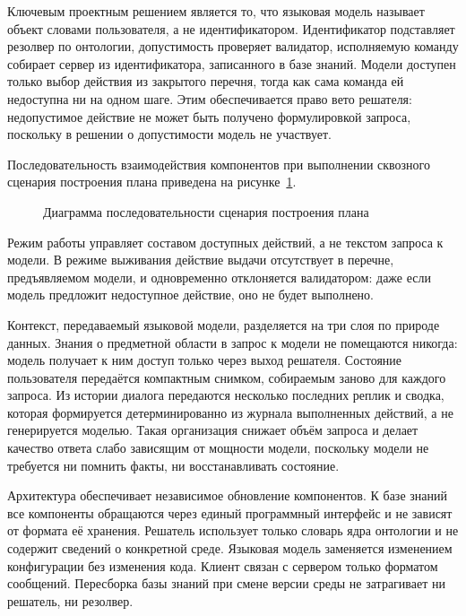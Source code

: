 Ключевым проектным решением является то, что языковая модель называет объект словами
пользователя, а не идентификатором. Идентификатор подставляет резолвер по онтологии,
допустимость проверяет валидатор, исполняемую команду собирает сервер из
идентификатора, записанного в базе знаний. Модели доступен только выбор действия из
закрытого перечня, тогда как сама команда ей недоступна ни на одном шаге. Этим
обеспечивается право вето решателя: недопустимое действие не может быть получено
формулировкой запроса, поскольку в решении о допустимости модель не участвует\cite{Schick2023,Yao2023}.

Последовательность взаимодействия компонентов при выполнении сквозного сценария
построения плана приведена на рисунке~\ref{fig:sequence}.

\begin{figure}[!htb]
  \centering
  
  \caption{Диаграмма последовательности сценария построения плана}
  \label{fig:sequence}
\end{figure}

Режим работы управляет составом доступных действий, а не текстом запроса к модели. В
режиме выживания действие выдачи отсутствует в перечне, предъявляемом модели, и
одновременно отклоняется валидатором: даже если модель предложит недоступное действие,
оно не будет выполнено.

Контекст, передаваемый языковой модели, разделяется на три слоя по природе данных.
Знания о предметной области в запрос к модели не помещаются никогда: модель получает к
ним доступ только через выход решателя. Состояние пользователя передаётся компактным
снимком, собираемым заново для каждого запроса. Из истории диалога передаются
несколько последних реплик и сводка, которая формируется детерминированно из журнала
выполненных действий, а не генерируется моделью. Такая организация снижает объём
запроса и делает качество ответа слабо зависящим от мощности модели, поскольку модели
не требуется ни помнить факты, ни восстанавливать состояние\cite{Lewis2020}.

Архитектура обеспечивает независимое обновление компонентов. К базе знаний все
компоненты обращаются через единый программный интерфейс и не зависят от формата её
хранения. Решатель использует только словарь ядра онтологии и не содержит сведений о
конкретной среде. Языковая модель заменяется изменением конфигурации без изменения
кода. Клиент связан с сервером только форматом сообщений. Пересборка базы знаний при
смене версии среды не затрагивает ни решатель, ни резолвер.

